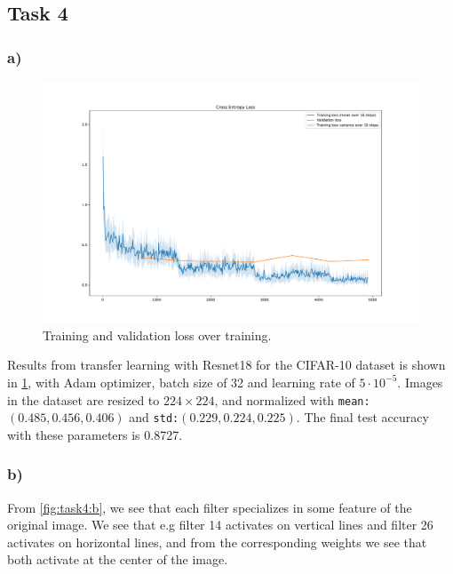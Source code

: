 \subsection*{Task 4}

\subsubsection*{a)}

\begin{figure}[h!]
  \centering
  \includegraphics[clip,trim=0cm 2cm 0cm 2cm, width=\textwidth]{figures/Task4a.pdf}
  \caption{Training and validation loss over training.}
  \label{fig:task4:a}
\end{figure}

Results from transfer learning with Resnet18 for the CIFAR-10 dataset is shown in \cref{fig:task4:a}, with Adam optimizer, batch size of 32 and learning rate of $5\cdot10^{-5}$. Images in the dataset are resized to $224\times224$, and normalized with \texttt{mean:}$(0.485,0.456,0.406)$ and \texttt{std:}$(0.229,0.224,0.225)$. The final test accuracy with these parameters is 0.8727.


\subsubsection*{b)}

From \cref{fig:task4:b}, we see that each filter specializes in some feature of the original image. We see that e.g filter 14 activates on vertical lines and filter 26 activates on horizontal lines, and from the corresponding weights we see that both activate at the center of the image.

